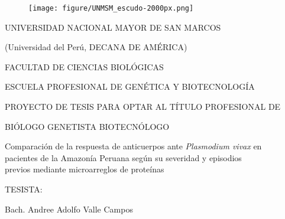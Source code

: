 \documentclass[
  a4paper]{article}
\author{}
\date{\vspace{-2.5em}}
\begin{document}
\renewcommand{\contentsname}{Índice General} 
\renewcommand{\tablename}{Tabla}
\renewcommand{\tableautorefname}{Tabla}


\clearpage
{}

\begin{centering}

\begin{figure}[!ht]
  \begin{center}
    \texttt{[image: figure/UNMSM\_escudo-2000px.png]}%
  \end{center}
\end{figure}

\LARGE %
UNIVERSIDAD NACIONAL MAYOR DE SAN MARCOS

\large
(Universidad del Perú, DECANA DE AMÉRICA)


\Large
FACULTAD DE CIENCIAS BIOLÓGICAS


\large
ESCUELA PROFESIONAL DE GENÉTICA Y BIOTECNOLOGÍA

\vspace{.5 cm}

\Large
PROYECTO DE TESIS PARA OPTAR AL TÍTULO PROFESIONAL DE 

BIÓLOGO GENETISTA BIOTECNÓLOGO

\vspace{2.5 cm}

\Large
Comparación de la respuesta de anticuerpos ante %
\textit{Plasmodium vivax}
en \\pacientes de la Amazonía Peruana %
según su severidad y episodios \\previos %
mediante microarreglos de proteínas

\vspace{2.5 cm}

\large
TESISTA:

Bach. Andree Adolfo Valle Campos

\vspace{.3 cm}


\end{centering}
\end{document}
